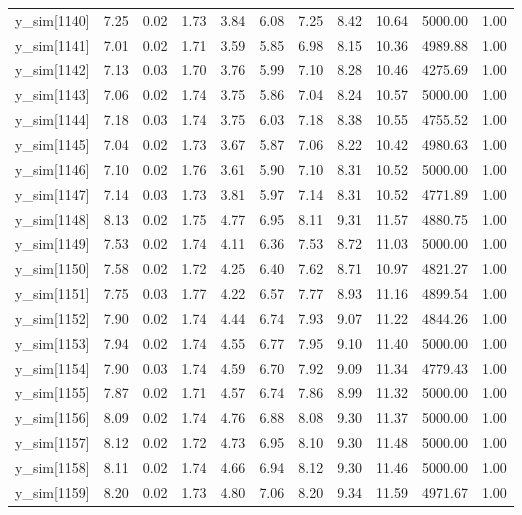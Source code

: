 \begin{table}[ht]
\begin{tabular}{rrrrrrrrrrr}
  y\_sim[1140] & 7.25 & 0.02 & 1.73 & 3.84 & 6.08 & 7.25 & 8.42 & 10.64 & 5000.00 & 1.00 \\ 
  y\_sim[1141] & 7.01 & 0.02 & 1.71 & 3.59 & 5.85 & 6.98 & 8.15 & 10.36 & 4989.88 & 1.00 \\ 
  y\_sim[1142] & 7.13 & 0.03 & 1.70 & 3.76 & 5.99 & 7.10 & 8.28 & 10.46 & 4275.69 & 1.00 \\ 
  y\_sim[1143] & 7.06 & 0.02 & 1.74 & 3.75 & 5.86 & 7.04 & 8.24 & 10.57 & 5000.00 & 1.00 \\ 
  y\_sim[1144] & 7.18 & 0.03 & 1.74 & 3.75 & 6.03 & 7.18 & 8.38 & 10.55 & 4755.52 & 1.00 \\ 
  y\_sim[1145] & 7.04 & 0.02 & 1.73 & 3.67 & 5.87 & 7.06 & 8.22 & 10.42 & 4980.63 & 1.00 \\ 
  y\_sim[1146] & 7.10 & 0.02 & 1.76 & 3.61 & 5.90 & 7.10 & 8.31 & 10.52 & 5000.00 & 1.00 \\ 
  y\_sim[1147] & 7.14 & 0.03 & 1.73 & 3.81 & 5.97 & 7.14 & 8.31 & 10.52 & 4771.89 & 1.00 \\ 
  y\_sim[1148] & 8.13 & 0.02 & 1.75 & 4.77 & 6.95 & 8.11 & 9.31 & 11.57 & 4880.75 & 1.00 \\ 
  y\_sim[1149] & 7.53 & 0.02 & 1.74 & 4.11 & 6.36 & 7.53 & 8.72 & 11.03 & 5000.00 & 1.00 \\ 
  y\_sim[1150] & 7.58 & 0.02 & 1.72 & 4.25 & 6.40 & 7.62 & 8.71 & 10.97 & 4821.27 & 1.00 \\ 
  y\_sim[1151] & 7.75 & 0.03 & 1.77 & 4.22 & 6.57 & 7.77 & 8.93 & 11.16 & 4899.54 & 1.00 \\ 
  y\_sim[1152] & 7.90 & 0.02 & 1.74 & 4.44 & 6.74 & 7.93 & 9.07 & 11.22 & 4844.26 & 1.00 \\ 
  y\_sim[1153] & 7.94 & 0.02 & 1.74 & 4.55 & 6.77 & 7.95 & 9.10 & 11.40 & 5000.00 & 1.00 \\ 
  y\_sim[1154] & 7.90 & 0.03 & 1.74 & 4.59 & 6.70 & 7.92 & 9.09 & 11.34 & 4779.43 & 1.00 \\ 
  y\_sim[1155] & 7.87 & 0.02 & 1.71 & 4.57 & 6.74 & 7.86 & 8.99 & 11.32 & 5000.00 & 1.00 \\ 
  y\_sim[1156] & 8.09 & 0.02 & 1.74 & 4.76 & 6.88 & 8.08 & 9.30 & 11.37 & 5000.00 & 1.00 \\ 
  y\_sim[1157] & 8.12 & 0.02 & 1.72 & 4.73 & 6.95 & 8.10 & 9.30 & 11.48 & 5000.00 & 1.00 \\ 
  y\_sim[1158] & 8.11 & 0.02 & 1.74 & 4.66 & 6.94 & 8.12 & 9.30 & 11.46 & 5000.00 & 1.00 \\ 
  y\_sim[1159] & 8.20 & 0.02 & 1.73 & 4.80 & 7.06 & 8.20 & 9.34 & 11.59 & 4971.67 & 1.00 \\ 

\end{tabular}
\end{table}
